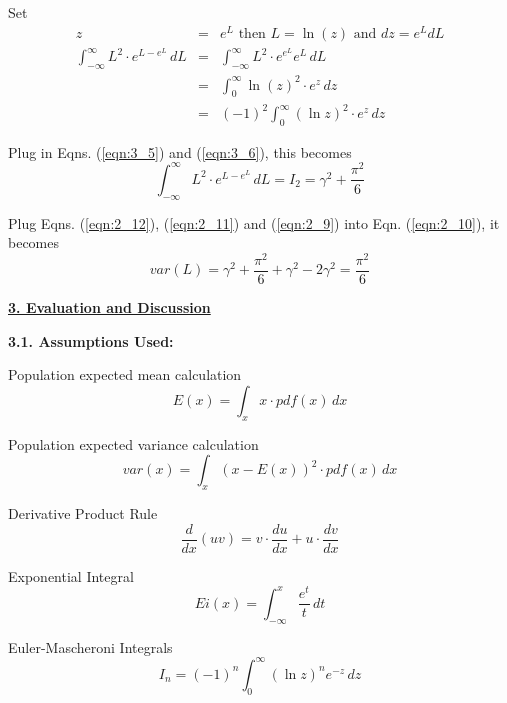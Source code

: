 \documentclass{beamer}
\begin{document}
Set
\begin{eqnarray*} 
 z &=& e^L \text{ then } L = \ln(z) \text{ and } dz = e^L dL \\
\int_{-\infty}^{\infty} \! L^2 \cdot e^{L-e^L}  \, dL 
	&=& \int_{-\infty}^{\infty} \! L^2 \cdot e^{e^L} e^L \, dL \\
	&=& \int_{0}^{\infty} \! \ln(z)^2 \cdot e^{z}  \, dz \\
	&=& (-1)^2 \int_{0}^{\infty} \! (\ln z)^2 \cdot e^{z}  \, dz 
\end{eqnarray*}

Plug in Eqns. (\ref{eqn:3_5}) and (\ref{eqn:3_6}), this becomes
\begin{equation}
\label{eqn:2_12}
\int_{-\infty}^{\infty} \! L^2 \cdot e^{L-e^L}  \, dL = I_2 = \gamma^2 + \frac{\pi^2}{6}
\end{equation}

Plug Eqns. (\ref{eqn:2_12}), (\ref{eqn:2_11}) and (\ref{eqn:2_9}) into Eqn. (\ref{eqn:2_10}), it becomes
\begin{equation}
\label{eqn:2_13}
var(L) = \gamma^2 + \frac{\pi^2}{6} + \gamma^2 - 2 \gamma^2 = \frac{\pi^2}{6}
\end{equation}

\underline{\textbf{3. Evaluation and Discussion}}

\textbf{3.1. Assumptions Used:}

Population expected mean calculation
\begin{equation}
  \label{eqn:3_1}
E(x) = \int_x \! x \cdot pdf(x)  \, dx
\end{equation}

Population expected variance calculation
\begin{equation}
  \label{eqn:3_2}
var(x) = \int_x \! (x-E(x))^2 \cdot pdf(x)  \, dx
\end{equation}

Derivative Product Rule
\begin{equation}
  \label{eqn:3_3}
\frac{d}{dx} (u v) = v \cdot \frac{du}{dx}+u \cdot \frac{dv}{dx}
\end{equation}

Exponential Integral
\begin{equation}
  \label{eqn:3_4}
Ei(x) = \int_{- \infty}^x \! \frac{e^t}{t} \, dt
\end{equation}

Euler-Mascheroni Integrals
\begin{equation}
  \label{eqn:3_5}
I_n = (-1)^n \int_0^\infty (\ln z)^n e^{-z} \, dz
\end{equation}
\end{document}
